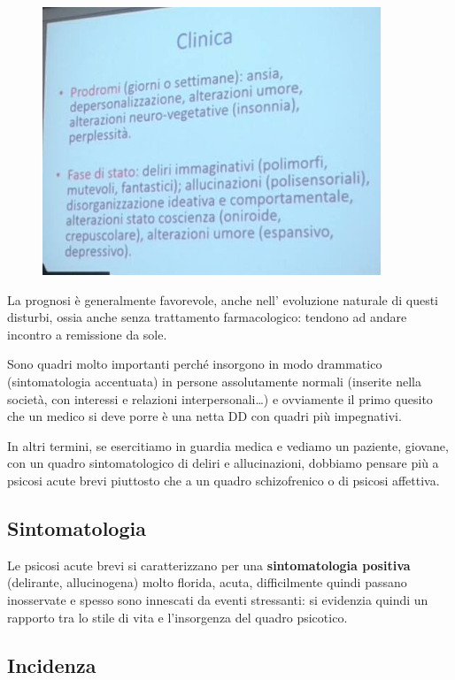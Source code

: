 \begin{figure}[!ht]
\centering
	\includegraphics[width=0.9\textwidth]{09/image1.jpeg}
\end{figure}

La prognosi è generalmente favorevole, anche nell' evoluzione naturale
di questi disturbi, ossia anche senza trattamento farmacologico: tendono
ad andare incontro a remissione da sole.

Sono quadri molto importanti perché insorgono in modo drammatico
(sintomatologia accentuata) in persone assolutamente normali (inserite
nella società, con interessi e relazioni interpersonali\ldots{}) e
ovviamente il primo quesito che un medico si deve porre è una netta DD
con quadri più impegnativi.

In altri termini, se esercitiamo in guardia medica e vediamo un
paziente, giovane, con un quadro sintomatologico di deliri e
allucinazioni, dobbiamo pensare più a psicosi acute brevi piuttosto che
a un quadro schizofrenico o di psicosi affettiva.

\subsection{Sintomatologia}

Le psicosi acute brevi si caratterizzano per una \textbf{sintomatologia
positiva} (delirante, allucinogena) molto florida, acuta, difficilmente
quindi passano inosservate e spesso sono innescati da eventi stressanti:
si evidenzia quindi un rapporto tra lo stile di vita e l'insorgenza del
quadro psicotico.

\subsection{Incidenza}

